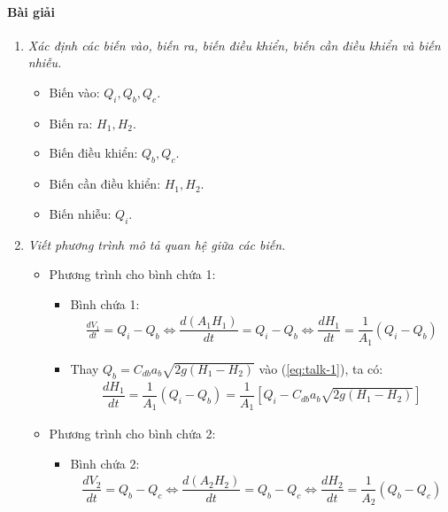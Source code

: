 \documentclass[12pt,a4paper]{article}
\begin{document}
    \paragraph{Bài giải}
        \begin{enumerate}[\it a.]
            \item \textit{Xác định các biến vào, biến ra, biến điều khiển, biến cần điều khiển và biến nhiễu.}
                \begin{itemize}
                    \item Biến vào: $Q_i, Q_b, Q_c$.
                    \item Biến ra: $H_1, H_2$.
                    \item Biến điều khiển: $Q_b, Q_c$.
                    \item Biến cần điều khiển: $H_1, H_2$.
                    \item Biến nhiễu: $Q_i$.
                \end{itemize}

            \item \textit{Viết phương trình mô tả quan hệ giữa các biến.}
                \begin{itemize}
                    \item Phương trình cho bình chứa 1:
                        \begin{itemize}
                            \item Bình chứa 1:
                                \begin{align} \label{eq:talk-1}
                                    \frac{dV_1}{dt} = Q_i - Q_b \Longleftrightarrow \dfrac{d \left({A_1 H_1}\right)}{dt} = Q_i - Q_b \Longleftrightarrow \dfrac{d H_1}{dt} = \dfrac{1}{A_1} \left({Q_i - Q_b}\right)
                                \end{align}

                            \item Thay $Q_b = C_{db}a_b\sqrt{2g(H_1 - H_2)}$ vào (\ref{eq:talk-1}), ta có:
                                \begin{align} \label{eq:talk-1-2}
                                    \dfrac{dH_1}{dt} = \dfrac{1}{A_1} \left({Q_i - Q_b}\right) = \dfrac{1}{A_1} \left[{Q_i - C_{db}a_b\sqrt{2g(H_1 - H_2)}}\right]
                                \end{align}
                        \end{itemize}

                    \item Phương trình cho bình chứa 2:
                        \begin{itemize}
                            \item Bình chứa 2:
                                \begin{align} \label{eq:talk-2}
                                    \dfrac{dV_2}{dt} = Q_b - Q_c \Longleftrightarrow \dfrac{d \left({A_2 H_2}\right)}{dt} = Q_b - Q_c \Longleftrightarrow \dfrac{d H_2}{dt} = \dfrac{1}{A_2} \left({Q_b - Q_c}\right)
                                \end{align}


\end{itemize}
\end{itemize}
\end{enumerate}
\end{document}
